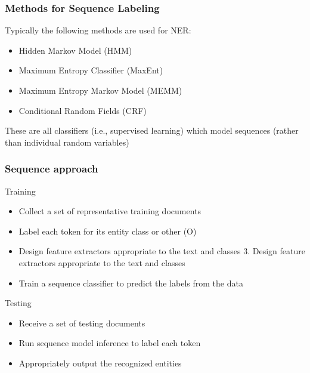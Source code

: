\begin{frame}[fragile]\frametitle{Methods for Sequence Labeling}
Typically the following methods are used for NER:
  \begin{itemize}
  \item Hidden Markov Model (HMM)
  \item Maximum Entropy Classifier (MaxEnt)
  \item Maximum Entropy Markov Model (MEMM)
  \item Conditional Random Fields (CRF)
  \end{itemize}
These are all classifiers (i.e., supervised learning) which model sequences (rather than individual random variables)
\end{frame}

\begin{frame}[fragile]\frametitle{Sequence approach}
Training
  \begin{itemize}
  \item  Collect a set of representative training documents
  \item  Label each token for its entity class or other (O)
  \item  Design feature extractors appropriate to the text and classes 3. Design feature extractors appropriate to the text and classes
  \item  Train a sequence classifier to predict the labels from the data
  \end{itemize}
Testing  
  \begin{itemize}
  \item  Receive a set of testing documents
  \item  Run sequence model inference to label each token
  \item  Appropriately output the recognized entities
  \end{itemize}
\end{frame}


